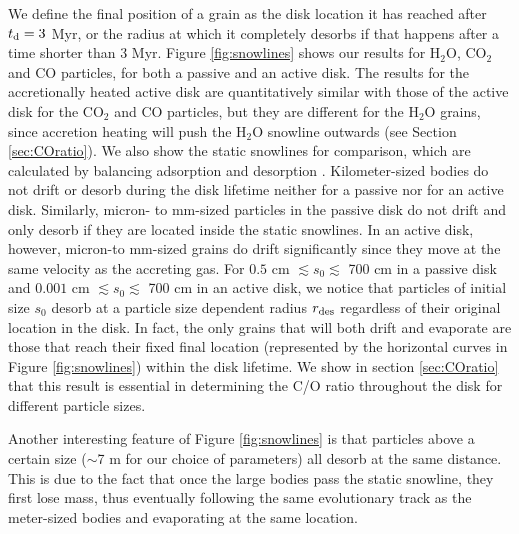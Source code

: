 \documentclass[apj]{emulateapj}
\begin{document}
We define the final position of a grain as the disk location it has reached after $t_{\rm d}=3$ Myr, or the radius at which it completely desorbs if that happens after a time shorter than 3 Myr.  Figure \ref{fig:snowlines} shows our results for H$_2$O, CO$_2$ and CO particles, for both a passive and an active disk. The results for the accretionally heated active disk are quantitatively similar with those of the active disk for the CO$_2$ and CO particles, but they are different for the H$_2$O grains, since accretion heating will push the H$_2$O snowline outwards (see Section \ref{sec:COratio}). We also show the static snowlines for comparison, which are calculated by balancing adsorption and desorption \citep{hollenbach09}. %
Kilometer-sized bodies do not drift or desorb during the disk lifetime neither for a passive nor for an active disk. Similarly, micron- to mm-sized particles in the passive disk do not drift and only %
desorb if %
they are located inside the static snowlines. %
In an active disk, however, micron-to mm-sized grains do drift significantly since they move at the same velocity as the accreting gas. For $0.5$ cm $\lesssim s_0 \lesssim$ 700 cm in a passive disk and $0.001$ cm $\lesssim s_0 \lesssim$ 700 cm in an active disk, we notice that particles of initial size $s_0$ desorb at a %
particle size dependent radius $r_{\rm des}$ regardless of their original location in the disk. In fact, the only grains that will both drift and evaporate are those that reach their fixed final location (represented by the horizontal curves in Figure \ref{fig:snowlines}) within the disk lifetime. We show in section \ref{sec:COratio} that this result is essential in determining the C/O ratio throughout the disk for different particle sizes. 

Another interesting feature of Figure \ref{fig:snowlines} is that particles above a certain size ($\sim$7 m for our choice of parameters) all desorb at the same distance. This is due to the fact that once the large bodies pass the static snowline, they first lose mass, thus eventually following the same evolutionary track as the meter-sized bodies and evaporating at the same location.
\end{document}
